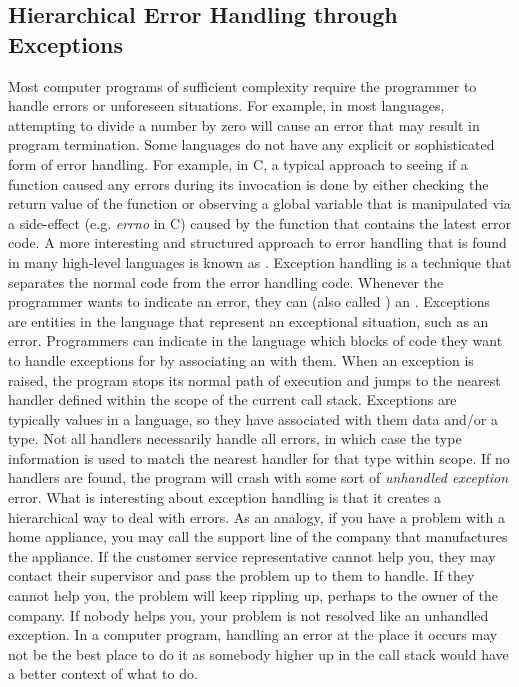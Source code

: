 \subsection{Hierarchical Error Handling through Exceptions}
Most computer programs of sufficient complexity require the programmer to handle errors or unforeseen situations. For example, in most languages, attempting to divide a number by zero will cause an error that may result in program termination. Some languages do not have any explicit or sophisticated form of error handling. For example, in C, a typical approach to seeing if a function caused any errors during its invocation is done by either checking the return value of the function or observing a global variable that is manipulated via a side-effect (e.g. \textit{errno} in C) caused by the function that contains the latest error code. A more interesting and structured approach to error handling that is found in many high-level languages is known as  \citep{sethi:proglang}. Exception handling is a technique that separates the normal code from the error handling code. Whenever the programmer wants to indicate an error, they can  (also called ) an . Exceptions are entities in the language that represent an exceptional situation, such as an error. Programmers can indicate in the language which blocks of code they want to handle exceptions for by associating an  with them. When an exception is raised, the program stops its normal path of execution and jumps to the nearest handler defined within the scope of the current call stack. Exceptions are typically values in a language, so they have associated with them data and/or a type. Not all handlers necessarily handle all errors, in which case the type information is used to match the nearest handler for that type within scope. If no handlers are found, the program will crash with some sort of \textit{unhandled exception} error. What is interesting about exception handling is that it creates a hierarchical way to deal with errors. As an analogy, if you have a problem with a home appliance, you may call the support line of the company that manufactures the appliance. If the customer service representative cannot help you, they may contact their supervisor and pass the problem up to them to handle. If they cannot help you, the problem will keep rippling up, perhaps to the owner of the company. If nobody helps you, your problem is not resolved like an unhandled exception. In a computer program, handling an error at the place it occurs may not be the best place to do it as somebody higher up in the call stack would have a better context of what to do.

